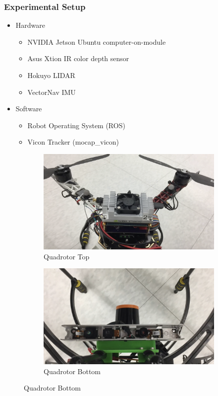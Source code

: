 \documentclass[11pt,professionalfonts,hyperref={pdftex,pdfpagemode=none,pdfstartview=FitH}]{beamer}
\begin{document}
\begin{frame}
\frametitle{Experimental Setup}
\begin{itemize}
        	\item Hardware
	\begin{itemize}
		\item NVIDIA Jetson Ubuntu computer-on-module
		\item Asus Xtion IR color depth sensor
		\item Hokuyo LIDAR
		\item VectorNav IMU
	\end{itemize}
	\item Software
	\begin{itemize}
		\item Robot Operating System (ROS)
		\item Vicon Tracker (mocap\_vicon)
	\end{itemize}
\end{itemize}
\begin{figure}
  \centering
  \begin{subfigure}[t]{.4\linewidth}
    \centering\includegraphics[height=.5\linewidth]{quad_top.png}
    \caption*{Quadrotor Top}
  \end{subfigure}
  \begin{subfigure}[t]{.4\linewidth}
    \centering\includegraphics[height=.5\linewidth]{quad_bottom.png}
    \caption*{Quadrotor Bottom}
  \end{subfigure}
\end{figure}
\end{frame}
\end{document}
